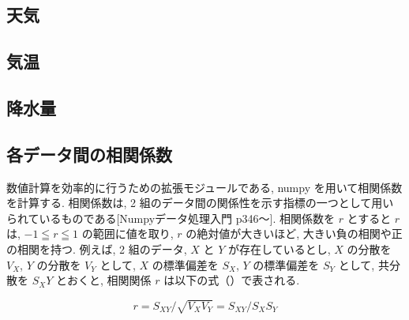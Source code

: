
\subsection{天気}

\subsection{気温}

\subsection{降水量}

\subsection{各データ間の相関係数}

数値計算を効率的に行うための拡張モジュールである, numpy を用いて相関係数を計算する.
相関係数は, 2 組のデータ間の関係性を示す指標の一つとして用いられているものである[Numpyデータ処理入門 p346〜].
相関係数を $r$ とすると $r$ は, $-1 ≦ r ≦ 1$ の範囲に値を取り, $r$ の絶対値が大きいほど, 大きい負の相関や正の相関を持つ.
例えば, 2 組のデータ, $X$ と $Y$ が存在しているとし, $X$ の分散を $V_X$, $Y$ の分散を $V_Y$ として, $X$ の標準偏差を $S_X$, $Y$ の標準偏差を $S_Y$ として, 共分散を $S_XY$ とおくと, 相関関係 $r$ は以下の式（）で表される.

\begin{equation}
  r = S_{XY}/\sqrt{V_XV_Y} = S_{XY}/S_XS_Y
  \label{eq:corrcoef}
\end{equation}
